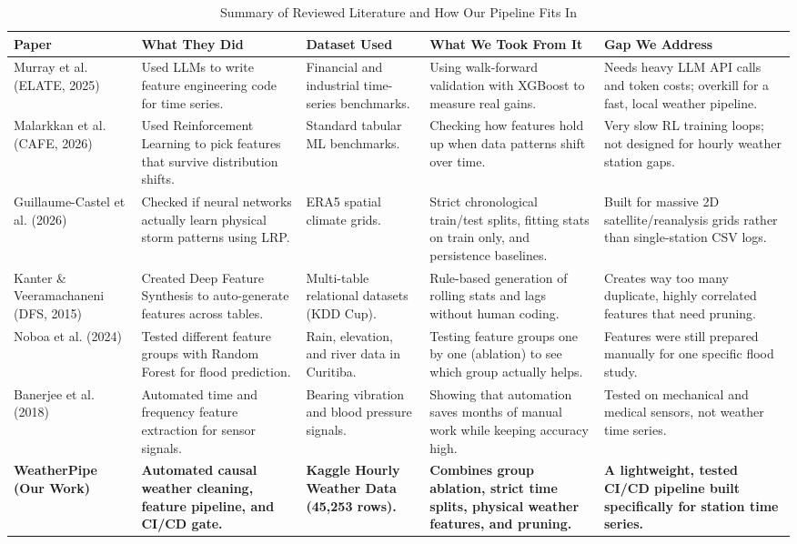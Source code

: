 \documentclass[conference]{IEEEtran}
\begin{document}
\begin{table}[t]
\caption{Summary of Reviewed Literature and How Our Pipeline Fits In}
\label{tab:lit_review}
\centering
\begin{tabular}{@{}p{3.0cm}p{3.6cm}p{3.2cm}p{3.4cm}p{3.2cm}@{}}
\toprule
\textbf{Paper} & \textbf{What They Did} & \textbf{Dataset Used} & \textbf{What We Took From It} & \textbf{Gap We Address} \\ \midrule
Murray et al. (ELATE, 2025) \cite{elate2025} & Used LLMs to write feature engineering code for time series. & Financial and industrial time-series benchmarks. & Using walk-forward validation with XGBoost to measure real gains. & Needs heavy LLM API calls and token costs; overkill for a fast, local weather pipeline. \\
Malarkkan et al. (CAFE, 2026) \cite{cafe2026} & Used Reinforcement Learning to pick features that survive distribution shifts. & Standard tabular ML benchmarks. & Checking how features hold up when data patterns shift over time. & Very slow RL training loops; not designed for hourly weather station gaps. \\
Guillaume-Castel et al. (2026) \cite{guillaume2026} & Checked if neural networks actually learn physical storm patterns using LRP. & ERA5 spatial climate grids. & Strict chronological train/test splits, fitting stats on train only, and persistence baselines. & Built for massive 2D satellite/reanalysis grids rather than single-station CSV logs. \\
Kanter \& Veeramachaneni (DFS, 2015) \cite{kanter2015} & Created Deep Feature Synthesis to auto-generate features across tables. & Multi-table relational datasets (KDD Cup). & Rule-based generation of rolling stats and lags without human coding. & Creates way too many duplicate, highly correlated features that need pruning. \\
Noboa et al. (2024) \cite{noboa2024} & Tested different feature groups with Random Forest for flood prediction. & Rain, elevation, and river data in Curitiba. & Testing feature groups one by one (ablation) to see which group actually helps. & Features were still prepared manually for one specific flood study. \\
Banerjee et al. (2018) \cite{banerjee2018} & Automated time and frequency feature extraction for sensor signals. & Bearing vibration and blood pressure signals. & Showing that automation saves months of manual work while keeping accuracy high. & Tested on mechanical and medical sensors, not weather time series. \\
\textbf{WeatherPipe (Our Work)} & \textbf{Automated causal weather cleaning, feature pipeline, and CI/CD gate.} & \textbf{Kaggle Hourly Weather Data (45,253 rows).} & \textbf{Combines group ablation, strict time splits, physical weather features, and pruning.} & \textbf{A lightweight, tested CI/CD pipeline built specifically for station time series.} \\ \bottomrule
\end{tabular}
\end{table}
\end{document}
